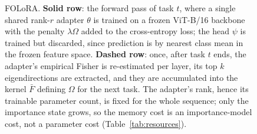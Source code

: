 \begin{figure}[t]
\caption{FOLoRA. \textbf{Solid row}: the forward pass of task $t$, where a single shared
rank-$r$ adapter $\theta$ is trained on a frozen ViT-B/16 backbone with the penalty
$\lambda\Omega$ added to the cross-entropy loss; the head $\psi$ is trained but discarded,
since prediction is by nearest class mean in the frozen feature space.
\textbf{Dashed row}: once, after task $t$ ends, the adapter's empirical Fisher is
re-estimated per layer, its top $k$ eigendirections are extracted, and they are
accumulated into the kernel $\bar{F}$ defining $\Omega$ for the next task. The adapter's
rank, hence its trainable parameter count, is fixed for the whole sequence; only the
importance state grows, so the memory cost is an importance-model cost, not a parameter
cost (Table~\ref{tab:resources}).}
\label{fig:framework}
\end{figure}
